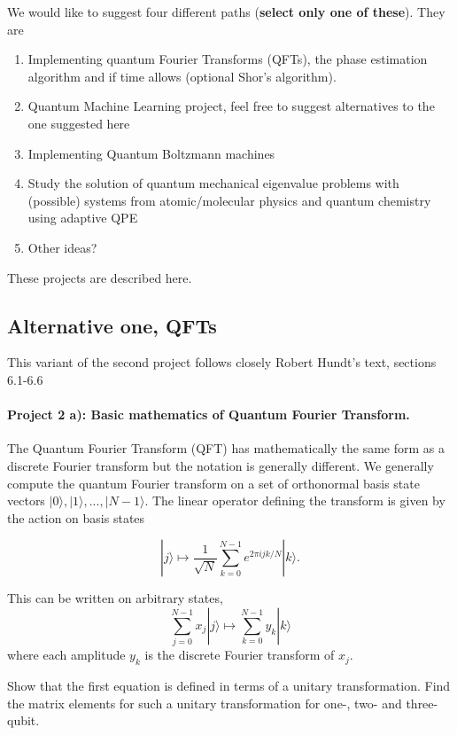 \documentclass[%
oneside,                 %
final,                   %
10pt]{article}
\begin{document}
We would like to suggest four different paths (\textbf{select only one of these}). They are

\begin{enumerate}
\item Implementing quantum Fourier Transforms (QFTs), the phase estimation algorithm and if time allows (optional Shor's algorithm).

\item Quantum Machine Learning project, feel free to suggest alternatives to the one suggested here

\item Implementing Quantum Boltzmann machines

\item Study the solution of quantum mechanical eigenvalue problems with (possible) systems from atomic/molecular physics and quantum chemistry using adaptive QPE

\item Other ideas?  
\end{enumerate}

\noindent
These projects are described here.

\subsection*{Alternative one, QFTs}

This variant of the second project follows closely Robert Hundt's text, sections 6.1-6.6

\paragraph{Project 2 a): Basic mathematics of  Quantum Fourier Transform.}
The Quantum Fourier Transform (QFT) has mathematically the same form as a discrete Fourier transform
but the notation is generally different. We generally compute the
quantum Fourier transform on a set of orthonormal basis state vectors
\(|0\rangle, |1\rangle, ..., |N-1\rangle\). The linear operator defining
the transform is given by the action on basis states

\[
|j\rangle \mapsto \frac{1}{\sqrt{N}} \sum_{k=0}^{N-1} e^{2\pi ijk/N}|k\rangle.
\]

This can be written on arbitrary states,
\[
\sum_{j=0}^{N-1}x_j|j\rangle \mapsto \sum_{k=0}^{N-1} y_k|k\rangle
\]
where each amplitude \(y_k\) is the discrete Fourier transform of
\(x_j\).

Show that the first equation is defined in terms of a unitary
transformation. Find the matrix elements for such a unitary
transformation for one-, two- and three-qubit.
\end{document}
